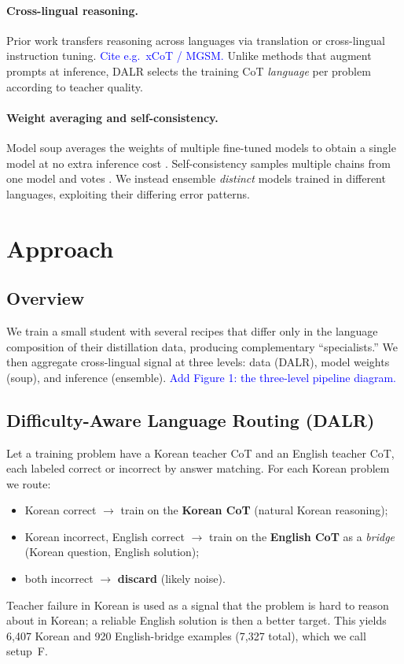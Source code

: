 \documentclass{article}
\newcommand{\note}[1]{\textcolor{blue}{{#1}}}
\begin{document}
\paragraph{Cross-lingual reasoning.}
Prior work transfers reasoning across languages via translation or
cross-lingual instruction tuning. \note{Cite e.g.\ xCoT / MGSM.} Unlike
methods that augment prompts at inference, DALR selects the training CoT
\emph{language} per problem according to teacher quality.

\paragraph{Weight averaging and self-consistency.}
Model soup averages the weights of multiple fine-tuned models to obtain a
single model at no extra inference cost \citep{wortsman2022soup}.
Self-consistency samples multiple chains from one model and votes
\citep{wang2022selfconsistency}. We instead ensemble \emph{distinct}
models trained in different languages, exploiting their differing error
patterns.

\section{Approach}
\label{sec:approach}

\subsection{Overview}
We train a small student with several recipes that differ only in the
language composition of their distillation data, producing complementary
``specialists.'' We then aggregate cross-lingual signal at three levels:
data (DALR), model weights (soup), and inference (ensemble).
\note{Add Figure 1: the three-level pipeline diagram.}

\subsection{Difficulty-Aware Language Routing (DALR)}
\label{sec:dalr}
Let a training problem have a Korean teacher CoT and an English teacher
CoT, each labeled correct or incorrect by answer matching. For each
Korean problem we route:
\begin{itemize}
  \item Korean correct $\rightarrow$ train on the \textbf{Korean CoT}
  (natural Korean reasoning);
  \item Korean incorrect, English correct $\rightarrow$ train on the
  \textbf{English CoT} as a \emph{bridge} (Korean question, English
  solution);
  \item both incorrect $\rightarrow$ \textbf{discard} (likely noise).
\end{itemize}
Teacher failure in Korean is used as a signal that the problem is hard to
reason about in Korean; a reliable English solution is then a better
target. This yields 6{,}407 Korean and 920 English-bridge examples
(7{,}327 total), which we call setup~F.
\end{document}
